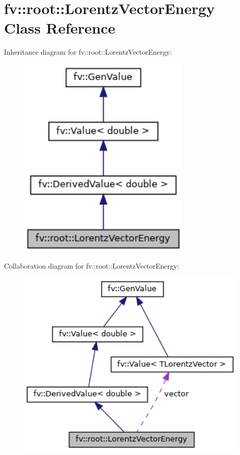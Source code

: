 \hypertarget{classfv_1_1root_1_1LorentzVectorEnergy}{}\section{fv\+:\+:root\+:\+:Lorentz\+Vector\+Energy Class Reference}
\label{classfv_1_1root_1_1LorentzVectorEnergy}


Inheritance diagram for fv\+:\+:root\+:\+:Lorentz\+Vector\+Energy\+:
\nopagebreak
\begin{figure}[H]
\begin{center}
\leavevmode
\includegraphics[width=238pt]{classfv_1_1root_1_1LorentzVectorEnergy__inherit__graph}
\end{center}
\end{figure}


Collaboration diagram for fv\+:\+:root\+:\+:Lorentz\+Vector\+Energy\+:
\nopagebreak
\begin{figure}[H]
\begin{center}
\leavevmode
\includegraphics[width=340pt]{classfv_1_1root_1_1LorentzVectorEnergy__coll__graph}
\end{center}
\end{figure}
